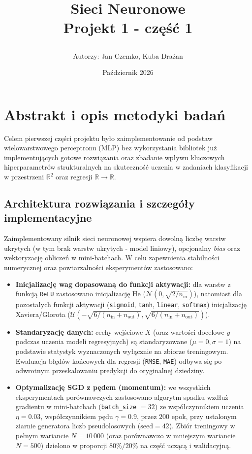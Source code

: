 \documentclass{article}
\title{%

    \begin{figure}[h]
        \centering
        \hspace*{-1.5cm}
        
    \end{figure}
    
    \vspace{\baselineskip}
    \vspace{\baselineskip}
    \Huge \textbf{Sieci Neuronowe} \\
    \Huge Projekt 1 - część 1
     \vfill
    }
\author{Autorzy: Jan Czemko, Kuba Drażan
    \vspace{\baselineskip} }
\date{Październik 2026}
\begin{document}
\maketitle

\newpage

\section{Abstrakt i opis metodyki badań}

Celem pierwszej części projektu było zaimplementowanie od podstaw wielowarstwowego perceptronu (MLP) bez wykorzystania bibliotek już implementujących gotowe rozwiązania oraz zbadanie wpływu kluczowych hiperparametrów strukturalnych na skuteczność uczenia w zadaniach klasyfikacji w przestrzeni $\mathbb{R}^2$ oraz regresji $\mathbb{R} \to \mathbb{R}$.

\subsection{Architektura rozwiązania i szczegóły implementacyjne}
Zaimplementowany silnik sieci neuronowej wspiera dowolną liczbę warstw ukrytych (w tym brak warstw ukrytych - model liniowy), opcjonalny \textit{bias} oraz wektoryzację obliczeń w mini-batchach. W celu zapewnienia stabilności numerycznej oraz powtarzalności eksperymentów zastosowano:
\begin{itemize}
    \item \textbf{Inicjalizację wag dopasowaną do funkcji aktywacji:} dla warstw z funkcją \texttt{ReLU} zastosowano inicjalizację He ($\mathcal{N}(0, \sqrt{2/n_{\text{in}}})$), natomiast dla pozostałych funkcji aktywacji (\texttt{sigmoid}, \texttt{tanh}, \texttt{linear}, \texttt{softmax}) inicjalizację Xaviera/Glorota ($\mathcal{U}(-\sqrt{6/(n_{\text{in}}+n_{\text{out}})}, \sqrt{6/(n_{\text{in}}+n_{\text{out}})})$).
    \item \textbf{Standaryzację danych:} cechy wejściowe $X$ (oraz wartości docelowe $y$ podczas uczenia modeli regresyjnych) są standaryzowane ($\mu = 0, \sigma = 1$) na podstawie statystyk wyznaczonych wyłącznie na zbiorze treningowym. Ewaluacja błędów końcowych dla regresji (\texttt{RMSE}, \texttt{MAE}) odbywa się po odwrotnym przeskalowaniu predykcji do oryginalnej dziedziny.
    \item \textbf{Optymalizację SGD z pędem (momentum):} we wszystkich eksperymentach porównawczych zastosowano algorytm spadku wzdłuż gradientu w mini-batchach (\texttt{batch\_size} $= 32$) ze współczynnikiem uczenia $\eta = 0.03$, współczynnikiem pędu $\gamma = 0.9$, przez $200$ epok, przy ustalonym ziarnie generatora liczb pseudolosowych ($\text{seed} = 42$). Zbiór treningowy w pełnym wariancie $N = 10\,000$ (oraz porównawczo w mniejszym wariancie $N = 500$) dzielono w proporcji $80\% / 20\%$ na część uczącą i walidacyjną.
\end{itemize}
\end{document}
